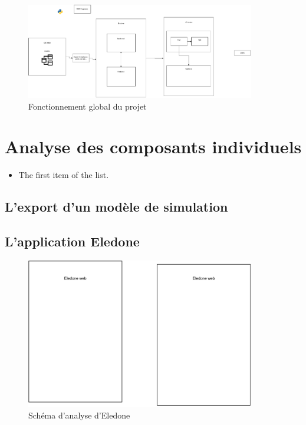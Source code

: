 \documentclass{rapport_stage}
\begin{document}
\begin{figure}[ht]
  \centering
  \includegraphics[width=10cm]{figures/architecture_global.pdf}
  \caption{Fonctionnement global du projet}
  \label{fig:fonctionnement-lobal-projet}
\end{figure}

\chapter{Analyse des composants individuels}

\begin{itemize}[label=$\bullet$]
  \item The first item of the list.
\end{itemize}

\section{L'export d'un modèle de simulation}

\section{L'application Eledone}

\begin{figure}[ht]
  \centering
  \includegraphics[width=10cm]{figures/eledone.pdf}
  \caption{Schéma d'analyse d'Eledone}
  \label{fig:analyse-eledone}
\end{figure}
\end{document}
